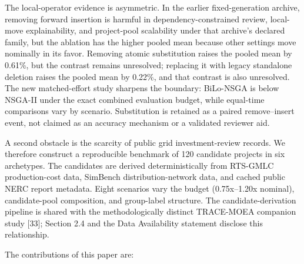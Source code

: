 \documentclass[
]{article}
\begin{document}
The local-operator evidence is asymmetric. In the earlier fixed-generation archive, removing forward insertion is harmful in dependency-constrained review, local-move explainability, and project-pool scalability under that archive's declared family, but the ablation has the higher pooled mean because other settings move nominally in its favor. Removing atomic substitution raises the pooled mean by 0.61\%, but the contrast remains unresolved; replacing it with legacy standalone deletion raises the pooled mean by 0.22\%, and that contrast is also unresolved. The new matched-effort study sharpens the boundary: BiLo-NSGA is below NSGA-II under the exact combined evaluation budget, while equal-time comparisons vary by scenario. Substitution is retained as a paired remove--insert event, not claimed as an accuracy mechanism or a validated reviewer aid.

A second obstacle is the scarcity of public grid investment-review records. We therefore construct a reproducible benchmark of 120 candidate projects in six archetypes. The candidates are derived deterministically from RTS-GMLC production-cost data, SimBench distribution-network data, and cached public NERC report metadata. Eight scenarios vary the budget (0.75x--1.20x nominal), candidate-pool composition, and group-label structure. The candidate-derivation pipeline is shared with the methodologically distinct TRACE-MOEA companion study {[}33{]}; Section 2.4 and the Data Availability statement disclose this relationship.

The contributions of this paper are:
\end{document}
